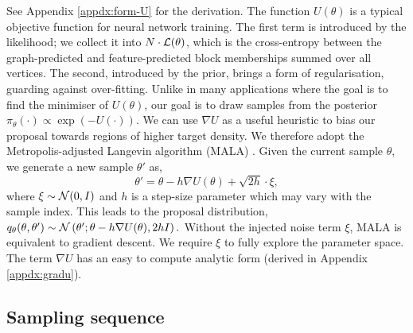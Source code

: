 See Appendix \ref{appdx:form-U} for the derivation. The function $U(\theta)$ is a typical objective function for neural network training. The first term is introduced by the likelihood; we collect it into $N \cdot \mathcal{L}(\theta)$, which is the cross-entropy between the graph-predicted and feature-predicted block memberships summed over all vertices. 
The second, introduced by the prior, brings a form of regularisation, guarding against over-fitting. Unlike in many applications where the goal 
is to find the minimiser of $U(\theta)$, our goal is to draw samples from the posterior $\pi_\theta(\cdot) \propto \exp(-U(\cdot))$. We can use $\nabla U$ as a useful heuristic to bias our proposal towards regions of higher target density. We therefore adopt the Metropolis-adjusted Langevin algorithm (MALA) \cite{mala-tweedie}. Given the current sample $\theta$, we generate 
a new sample $\theta'$ as,
%
\begin{equation*}
	\theta' = \theta - h \nabla U(\theta) + \sqrt{2h} \cdot \xi,
\end{equation*}
%
where $\xi \sim \mathcal{N}(0, I)$ and $h$ is a step-size parameter 
which may vary with the sample index.
This leads to the proposal distribution,
$q_\theta(\theta, \theta') \sim \mathcal{N} \left( \theta' ; \theta - h \nabla U(\theta), 2h I \right).$
Without the injected noise term $\xi$, MALA is equivalent to gradient descent. We require $\xi$ to fully explore the parameter space. 
The term $\nabla U$ has an easy to compute analytic form (derived in Appendix \ref{appdx:gradu}).

\subsection{Sampling sequence}
\label{s:ss}

